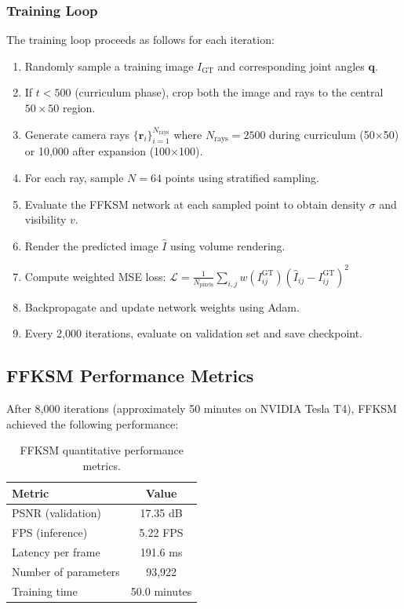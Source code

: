 \documentclass[12pt,a4paper,oneside]{report}
\begin{document}
\subsubsection{Training Loop}
\label{subsubsec:training_loop}

The training loop proceeds as follows for each iteration:

\begin{enumerate}
    \item Randomly sample a training image $I_{\text{GT}}$ and corresponding joint angles $\mathbf{q}$.
    \item If $t < 500$ (curriculum phase), crop both the image and rays to the central $50 \times 50$ region.
    \item Generate camera rays $\{\mathbf{r}_i\}_{i=1}^{N_{\text{rays}}}$ where $N_{\text{rays}} = 2500$ during curriculum (50×50) or 10,000 after expansion (100×100).
    \item For each ray, sample $N=64$ points using stratified sampling.
    \item Evaluate the FFKSM network at each sampled point to obtain density $\sigma$ and visibility $v$.
    \item Render the predicted image $\hat{I}$ using volume rendering.
    \item Compute weighted MSE loss: $\mathcal{L} = \frac{1}{N_{\text{pixels}}} \sum_{i,j} w(I_{ij}^{\text{GT}}) (\hat{I}_{ij} - I_{ij}^{\text{GT}})^2$
    \item Backpropagate and update network weights using Adam.
    \item Every 2,000 iterations, evaluate on validation set and save checkpoint.
\end{enumerate}

\subsection{FFKSM Performance Metrics}
\label{subsec:ffksm_performance_metrics}

After 8,000 iterations (approximately 50 minutes on NVIDIA Tesla T4), FFKSM achieved the following performance:

\begin{table}[H]
\centering
\caption{FFKSM quantitative performance metrics.}
\label{tab:ffksm_performance}
\begin{tabular}{lc}
\toprule
Metric & Value \\
\midrule
PSNR (validation) & 17.35 dB \\
FPS (inference) & 5.22 FPS \\
Latency per frame & 191.6 ms \\
Number of parameters & 93,922 \\
Training time & 50.0 minutes \\
\bottomrule
\end{tabular}
\end{table}
\end{document}
